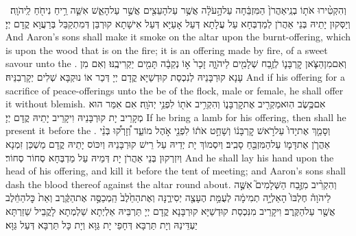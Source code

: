 {וְהִקְטִ֨ירוּ אֹת֤וֹ בְנֵֽי\maqqaf אַהֲרֹן֙ הַמִּזְבֵּ֔חָה עַל\maqqaf הָ֣עֹלָ֔ה אֲשֶׁ֥ר עַל\maqqaf הָעֵצִ֖ים אֲשֶׁ֣ר עַל\maqqaf הָאֵ֑שׁ אִשֵּׁ֛ה רֵ֥יחַ נִיחֹ֖חַ לַֽיהֹוָֽה׃ \petucha }
{וְיַסְּקוּן יָתֵיהּ בְּנֵי אַהֲרֹן לְמַדְבְּחָא עַל עֲלָתָא דְּעַל אָעַיָּא דְּעַל אִישָׁתָא קוּרְבַּן דְּמִתְקַבַּל בְּרַעֲוָא קֳדָם יְיָ׃}
{And Aaron’s sons shall make it smoke on the altar upon the burnt-offering, which is upon the wood that is on the fire; it is an offering made by fire, of a sweet savour unto the \lord.}{}
{וְאִם\maqqaf מִן\maqqaf הַצֹּ֧אן קׇרְבָּנ֛וֹ לְזֶ֥בַח שְׁלָמִ֖ים לַיהֹוָ֑ה זָכָר֙ א֣וֹ נְקֵבָ֔ה תָּמִ֖ים יַקְרִיבֶֽנּוּ׃}
{וְאִם מִן עָנָא קוּרְבָּנֵיהּ לְנִכְסַת קוּדְשַׁיָּא קֳדָם יְיָ דְּכַר אוֹ נוּקְבָּא שְׁלִים יְקָרְבִנֵּיהּ׃}
{And if his offering for a sacrifice of peace-offerings unto the \lord\space be of the flock, male or female, he shall offer it without blemish.}{}
{אִם\maqqaf כֶּ֥שֶׂב הֽוּא\maqqaf מַקְרִ֖יב אֶת\maqqaf קׇרְבָּנ֑וֹ וְהִקְרִ֥יב אֹת֖וֹ לִפְנֵ֥י יְהֹוָֽה׃}
{אִם אִמַּר הוּא מְקָרֵיב יָת קוּרְבָּנֵיהּ וִיקָרֵיב יָתֵיהּ קֳדָם יְיָ׃}
{If he bring a lamb for his offering, then shall he present it before the \lord.}{}
{וְסָמַ֤ךְ אֶת\maqqaf יָדוֹ֙ עַל\maqqaf רֹ֣אשׁ קׇרְבָּנ֔וֹ וְשָׁחַ֣ט אֹת֔וֹ לִפְנֵ֖י אֹ֣הֶל מוֹעֵ֑ד וְ֠זָרְק֠וּ בְּנֵ֨י אַהֲרֹ֧ן אֶת\maqqaf דָּמ֛וֹ עַל\maqqaf הַמִּזְבֵּ֖חַ סָבִֽיב׃}
{וְיִסְמוֹךְ יָת יְדֵיהּ עַל רֵישׁ קוּרְבָּנֵיהּ וְיִכּוֹס יָתֵיהּ קֳדָם מַשְׁכַּן זִמְנָא וְיִזְרְקוּן בְּנֵי אַהֲרֹן יָת דְּמֵיהּ עַל מַדְבְּחָא סְחוֹר סְחוֹר׃}
{And he shall lay his hand upon the head of his offering, and kill it before the tent of meeting; and Aaron’s sons shall dash the blood thereof against the altar round about.}{}
{וְהִקְרִ֨יב מִזֶּ֣בַח הַשְּׁלָמִים֮ אִשֶּׁ֣ה לַיהֹוָה֒ חֶלְבּוֹ֙ הָאַלְיָ֣ה תְמִימָ֔ה לְעֻמַּ֥ת הֶעָצֶ֖ה יְסִירֶ֑נָּה וְאֶת\maqqaf הַחֵ֙לֶב֙ הַֽמְכַסֶּ֣ה אֶת\maqqaf הַקֶּ֔רֶב וְאֵת֙ כׇּל\maqqaf הַחֵ֔לֶב אֲשֶׁ֖ר עַל\maqqaf הַקֶּֽרֶב׃}
{וִיקָרֵיב מִנִּכְסַת קוּדְשַׁיָּא קוּרְבָּנָא קֳדָם יְיָ תַּרְבֵּיהּ אַלְיְתָא שַׁלְמְתָא לָקֳבֵיל שַׁזַרְתָּא יַעְדֵּינַהּ וְיָת תַּרְבָּא דְּחָפֵי יָת גַּוָּא וְיָת כָּל תַּרְבָּא דְּעַל גַּוָּא׃}
